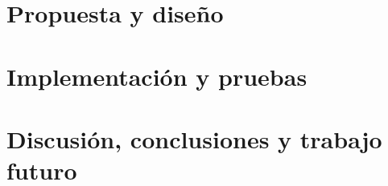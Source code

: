 \documentclass[12pt,twoside]{report}
\begin{document}
        \chapter{Propuesta y diseño}
        
        \chapter{Implementación y pruebas}
        
        \chapter{Discusión, conclusiones y trabajo futuro}
        
        
        
    
    
\end{document}
